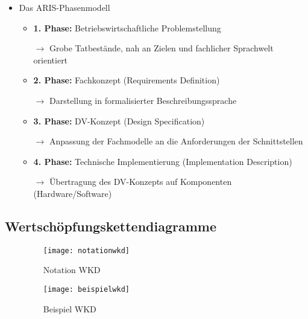 \begin{itemize}
\begin{itemize}
		\item Das ARIS-Phasenmodell
			\begin{itemize}
			\item \textbf{1. Phase:} Betriebswirtschaftliche Problemstellung 
			\item[$\rightarrow$]  Grobe Tatbestände, nah an Zielen und fachlicher Sprachwelt orientiert
			\item \textbf{2. Phase:} Fachkonzept (Requirements Definition)
			\item[$\rightarrow$] Darstellung in formalisierter Beschreibungssprache
			\item \textbf{3. Phase:} DV-Konzept (Design Specification)
			\item[$\rightarrow$] Anpassung der Fachmodelle an die Anforderungen der Schnittstellen
			\item \textbf{4. Phase:} Technische Implementierung (Implementation Description)
			\item[$\rightarrow$] Übertragung des DV-Konzepts auf Komponenten (Hardware/Software)
			\end{itemize}
			
		\end{itemize}

\end{itemize}

\subsection{Wertschöpfungskettendiagramme}
	\begin{itemize}
	\item[] 
	\begin{figure}[H]
	\texttt{[image: notationwkd]} 
	\caption{Notation WKD}
	\end{figure}
	\item[] 
	\begin{figure}[H]
	\texttt{[image: beispielwkd]}
	\caption{Beispiel WKD}
	\end{figure}
	\end{itemize}

